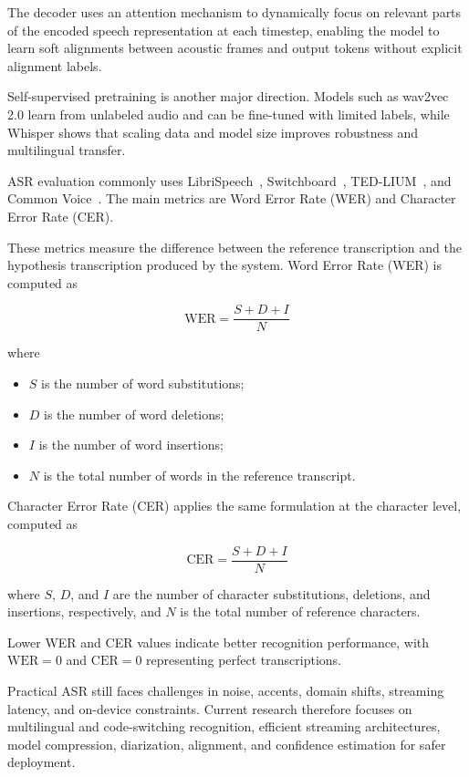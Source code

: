 The decoder uses an attention mechanism to dynamically focus on relevant parts of the encoded speech representation at each timestep, enabling the model to learn soft alignments between acoustic frames and output tokens without explicit alignment labels.

Self-supervised pretraining is another major direction. Models such as wav2vec 2.0 learn from unlabeled audio and can be fine-tuned with limited labels, while Whisper shows that scaling data and model size improves robustness and multilingual transfer.

ASR evaluation commonly uses LibriSpeech~\cite{panayotov2015librispeech}, Switchboard~\cite{switchboard1992}, TED-LIUM~\cite{rousseau2012tedlium}, and Common Voice~\cite{ardila2020commonvoice}. The main metrics are Word Error Rate (WER) and Character Error Rate (CER).

These metrics measure the difference between the reference transcription and the hypothesis transcription produced by the system. Word Error Rate (WER) is computed as

\begin{equation*}
    \text{WER} = \dfrac{S + D + I}{N}
    \label{eq:wer}
\end{equation*}

where
\begin{itemize}
    \item $S$ is the number of word substitutions;
    \item $D$ is the number of word deletions;
    \item $I$ is the number of word insertions;
    \item $N$ is the total number of words in the reference transcript.
\end{itemize}

Character Error Rate (CER) applies the same formulation at the character level, computed as

\begin{equation}
    \text{CER} = \dfrac{S + D + I}{N}
    \label{eq:cer}
\end{equation}

where $S$, $D$, and $I$ are the number of character substitutions, deletions, and insertions, respectively, and $N$ is the total number of reference characters.

Lower WER and CER values indicate better recognition performance, with $\text{WER} = 0$ and $\text{CER} = 0$ representing perfect transcriptions.

Practical ASR still faces challenges in noise, accents, domain shifts, streaming latency, and on-device constraints. Current research therefore focuses on multilingual and code-switching recognition, efficient streaming architectures, model compression, diarization, alignment, and confidence estimation for safer deployment.


